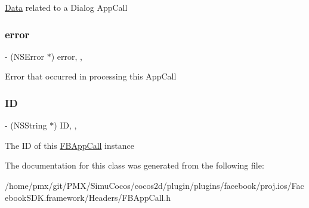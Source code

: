 \hyperlink{classData}{Data} related to a Dialog App\+Call \mbox{\label{interfaceFBAppCall_aed10727acfff363d6eb743f6007677a0}} 
\subsubsection{\texorpdfstring{error}{error}}
{\footnotesize\ttfamily -\/ (N\+S\+Error $\ast$) error\hspace{0.3cm}{\ttfamily [read]}, {\ttfamily [nonatomic]}, {\ttfamily [assign]}}

Error that occurred in processing this App\+Call \mbox{\label{interfaceFBAppCall_ac4740594ea012e6547f75e88693119eb}} 
\subsubsection{\texorpdfstring{ID}{ID}}
{\footnotesize\ttfamily -\/ (N\+S\+String $\ast$) ID\hspace{0.3cm}{\ttfamily [read]}, {\ttfamily [nonatomic]}, {\ttfamily [assign]}}

The ID of this \hyperlink{interfaceFBAppCall}{F\+B\+App\+Call} instance 

The documentation for this class was generated from the following file\+:\begin{DoxyCompactItemize}
\item 
/home/pmx/git/\+P\+M\+X/\+Simu\+Cocos/cocos2d/plugin/plugins/facebook/proj.\+ios/\+Facebook\+S\+D\+K.\+framework/\+Headers/F\+B\+App\+Call.\+h\end{DoxyCompactItemize}
